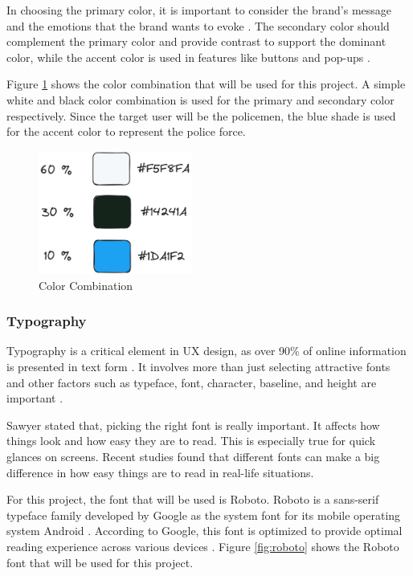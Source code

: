 In choosing the primary color, it is important to consider the brand's message and the emotions that the brand wants to evoke \cite{M._2023}. The secondary color should complement the primary color and provide contrast to support the dominant color, while the accent color is used in features like buttons and pop-ups  \cite{M._2023}.

Figure \ref{fig:color-combination} shows the color combination that will be used for this project. A simple white and black color combination is used for the primary and secondary color respectively. Since the target user will be the policemen, the blue shade is used for the accent color to represent the police force.

\begin{figure}[!ht]
    \centering
    \includegraphics[width=0.45\textwidth]{texs/Part2/chapter3/image/colorcombination.png}
    \caption{Color Combination}
    \label{fig:color-combination}
\end{figure}

\subsubsection{Typography}
Typography is a critical element in UX design, as over 90\% of online information is presented in text form \cite{Fitz-Patrick_2022}. It involves more than just selecting attractive fonts and other factors such as typeface, font, character, baseline, and height are important \cite{Fitz-Patrick_2022}.

Sawyer \cite{Sawyer2020} stated that, picking the right font is really important. It affects how things look and how easy they are to read. This is especially true for quick glances on screens. Recent studies found that different fonts can make a big difference in how easy things are to read in real-life situations.

For this project, the font that will be used is Roboto. Roboto is a sans-serif typeface family developed by Google as the system font for its mobile operating system Android \cite{Mott_2022}. According to Google, this font is optimized to provide optimal reading experience across various devices \cite{Mott_2022}. Figure \ref{fig:roboto} shows the Roboto font that will be used for this project.


